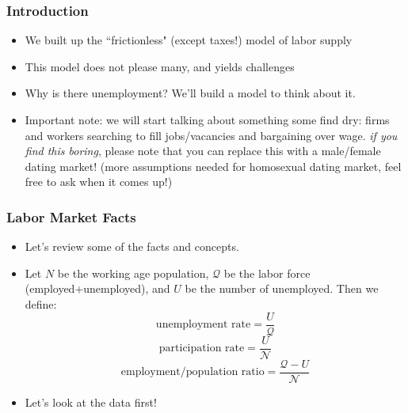 \documentclass{beamer}
\author{Trevor S. Gallen}
\date{}
\begin{document}
\renewcommand*{\inserttotalframenumber}{\pageref{lastframe}}



\begin{frame}
\titlepage
\end{frame}

\begin{frame}
\frametitle[alignment=center]{Introduction}
\begin{itemize}
\item We built up the ``frictionless" (except taxes!) model of labor supply
\bigskip
\item This model does not please many, and yields challenges  
\bigskip
\item Why is there unemployment?  We'll build a model to think about it.
\bigskip
\item Important note: we will start talking about something some find dry:  firms and workers searching to fill jobs/vacancies and bargaining over wage.  \emph{if you find this boring}, please note that you can replace this with a male/female dating market! (more assumptions needed for homosexual dating market, feel free to ask when it comes up!)
\end{itemize}
\end{frame}

\begin{frame}
\frametitle[alignment=center]{Labor Market Facts}
\begin{itemize}
\item Let's review some of the facts and concepts.
\bigskip
\item Let $N$ be the working age population, $\mathcal{Q}$ be the labor force (employed+unemployed), and $U$ be the number of unemployed.  Then we define:
$$\text{unemployment rate}=\frac{U}{\mathcal{Q}}$$
$$\text{participation rate}=\frac{U}{\mathcal{N}}$$
$$\text{employment/population ratio}=\frac{\mathcal{Q}-U}{\mathcal{N}}$$
\bigskip
\item Let's look at the data first!
\end{itemize}
\end{frame}
\end{document}
